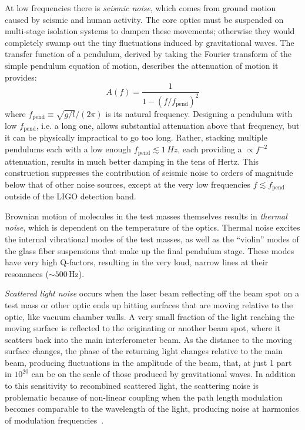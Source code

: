 At low frequencies there is \textit{seismic noise}, which comes from ground motion caused by seismic and human activity.
The core optics must be suspended on multi-stage isolation systems to dampen these movements; otherwise they would completely swamp out the tiny fluctuations induced by gravitational waves.
The transfer function of a pendulum, derived by taking the Fourier transform of the simple pendulum equation of motion, describes the attenuation of motion it provides:
\begin{equation}
  A(f) = \frac{1}{1 - (f / f_{\mathrm{pend}})^2}
\end{equation}
where $f_{\mathrm{pend}} \equiv \sqrt{g/l} / (2\pi)$ is its natural frequency.
Designing a pendulum with low $f_{\mathrm{pend}}$, i.e. a long one, allows substantial attenuation above that frequency, but it can be physically impractical to go too long.
Rather, stacking multiple pendulums each with a low enough $f_{\mathrm{pend}} \lesssim 1\,Hz$, each providing a $\propto f^{-2}$ attenuation, results in much better damping in the tens of Hertz.
This construction suppresses the contribution of seismic noise to orders of magnitude below that of other noise sources, except at the very low frequencies $f \lesssim f_{\mathrm{pend}}$ outside of the LIGO detection band.

Brownian motion of molecules in the test masses themselves results in \textit{thermal noise}, which is dependent on the temperature of the optics.
Thermal noise excites the internal vibrational modes of the test masses, as well as the ``violin'' modes of the glass fiber suspensions that make up the final pendulum stage.
These modes have very high Q-factors, resulting in the very loud, narrow lines at their resonances ($\sim 500$\,Hz).

\textit{Scattered light noise} occurs when the laser beam reflecting off the beam spot on a test mass or other optic ends up hitting surfaces that are moving relative to the optic, like vacuum chamber walls.
A very small fraction of the light reaching the moving surface is reflected to the originating or another beam spot, where it scatters back into the main interferometer beam.
As the distance to the moving surface changes, the phase of the returning light changes relative to the main beam, producing fluctuations in the amplitude of the beam, that, at just 1 part in $10^{20}$ can be on the scale of those produced by gravitational waves.
In addition to this sensitivity to recombined scattered light, the scattering noise is problematic because of non-linear coupling when the path length modulation becomes comparable to the wavelength of the light, producing noise at harmonics of modulation frequencies~\citep{Soni_2020}.

